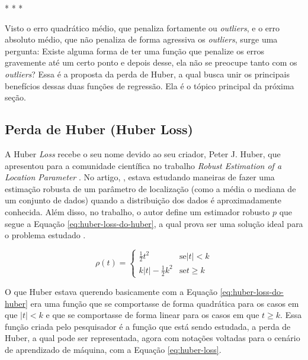 \medskip
\begin{center}
 * * *
\end{center}
\medskip

Visto o erro quadrático médio, que penaliza fortamente ou \textit{outliers}, e o erro absoluto médio, que não penaliza de forma agressiva os \textit{outliers}, surge uma pergunta: Existe alguma forma de ter uma função que penalize os erros gravemente até um certo ponto e depois desse, ela não se preocupe tanto com os \textit{outliers}? Essa é a proposta da perda de Huber, a qual busca unir os principais benefícios dessas duas funções de regressão. Ela é o tópico principal da próxima seção.

\subsection{Perda de Huber (Huber Loss)} 
\label{sec:huber-loss}

A Huber \textit{Loss} recebe o seu nome devido ao seu criador, Peter J. Huber, que apresentou para a comunidade científica no trabalho \textit{Robust Estimation of a Location Parameter} \parencite{HuberLoss}. No artigo, \textcite{HuberLoss}, estava estudando maneiras de fazer uma estimação robusta de um parâmetro de localização (como a média o mediana de um conjunto de dados) quando a distribuição dos dados é aproximadamente conhecida. Além disso, no trabalho, o autor define um estimador robusto $p$ que segue a Equação \ref{eq:huber-loss-do-huber}, a qual prova ser uma solução ideal para o problema estudado \parencite{HuberLoss}.

\begin{equation}
    \rho(t) = 
    \begin{cases}
        \frac{1}{2} t^2 & \text{se} |t| < k \\
        k |t| - \frac{1}{2} k^2 & \text{se} t \ge k
    \end{cases}
    \label{eq:huber-loss-do-huber}
\end{equation}

O que Huber estava querendo basicamente com a Equação \ref{eq:huber-loss-do-huber} era uma função que se comportasse de forma quadrática para os casos em que $|t| < k$ e que se comportasse de forma linear para os casos em que $t \ge k$. Essa função criada pelo pesquisador é a função que está sendo estudada, a perda de Huber, a qual pode ser representada, agora com notações voltadas para o cenário de aprendizado de máquina, com a Equação \ref{eq:huber-loss}.

